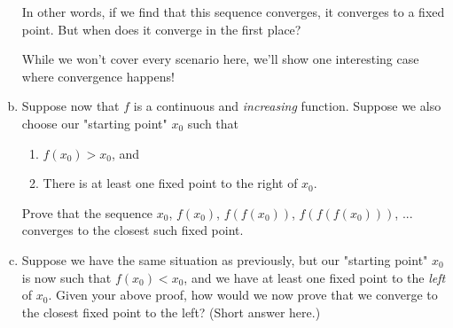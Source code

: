 \begin{problem}
\begin{enumerate}[(a)]
\vspace{10mm}
In other words, if we find that this sequence converges, it converges to a fixed point. But when does it converge in the first place? 

While we won't cover every scenario here, we'll show one interesting case where convergence happens!


\item Suppose now that $f$ is a continuous and \emph{increasing} function. Suppose we also choose our "starting point" $x_0$ such that 

\begin{enumerate}[(1)]
\item $f(x_0) > x_0$, and
\item There is at least one fixed point to the right of $x_0$.
\end{enumerate}

Prove that the sequence $x_0$, $f(x_0)$, $f(f(x_0))$, $f(f(f(x_0)))$, ... converges to the closest such fixed point.



\item Suppose we have the same situation as previously, but our "starting point" $x_0$ is now such that $f(x_0) < x_0$, and we have at least one fixed point to the \emph{left} of $x_0$. Given your above proof, how would we now prove that we converge to the closest fixed point to the left? (Short answer here.)




\end{enumerate}
\end{problem}




